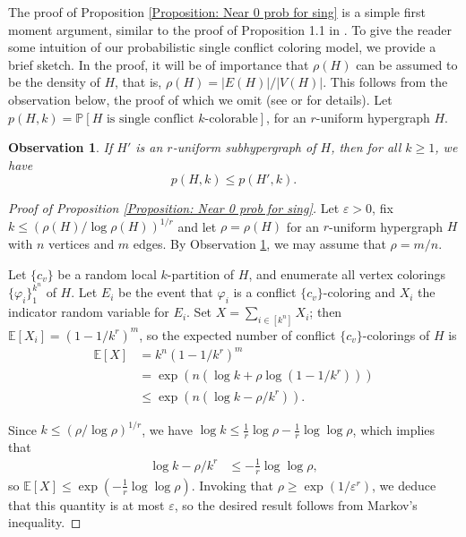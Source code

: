 \documentclass[12pt]{article}
\newtheorem{observation}[theorem]{Observation}
\newcommand{\E}{\mathbb{E}}
\renewcommand{\P}{\mathbb{P}}
\newcommand{\1}{\mathds{1}}
\begin{document}
The proof of Proposition  \ref{Proposition: Near 0 prob for sing} is a simple
first moment argument, similar to the proof of Proposition 1.1 in \cite{BernshteynDominikKaulMudrock}.
To give the reader some intuition of our probabilistic single conflict coloring model, we provide a brief sketch.
In the proof, it will be of importance that $\rho(H)$ can be assumed to be the density of $H$, that is, $\rho(H)=|E(H)|/|V(H)|$. This follows from the observation below, the proof of which we omit
(see \cite{BernshteynDominikKaulMudrock} or \cite{Eriksson} for details). 
Let $p(H,k)=\P[H \text{ is single conflict }k\text{-colorable}]$, for an $r$-uniform hypergraph $H$.
\begin{observation} 
\label{Observation: p'>p}
    If $H'$ is an $r$-uniform subhypergraph of $H$, then for all $k\geq 1$, we have
    $$
    p(H,k)\leq p(H',k).
    $$ 
\end{observation}
\begin{proof}[Proof of Proposition \ref{Proposition: Near 0 prob for sing}]
    Let $\varepsilon>0$, fix $k\leq (\rho(H)/\log \rho(H))^{1/r}$ and let $\rho=\rho(H)$ for an $r$-uniform hypergraph $H$ with $n$ vertices and $m$ edges. By Observation \ref{Observation: p'>p}, we may assume that $\rho=m/n$.

    Let $\{c_v\}$ be a random local $k$-partition of $H$, and enumerate all vertex colorings $\{\varphi_i\}_1^{k^n}$ of $H$. Let $E_i$ be the event that $\varphi_i$ is a conflict $\{c_v\}$-coloring and $X_i$ the indicator random variable for $E_i$. Set $X=\sum_{i\in [k^n]}X_i $; then
    $\E[X_i] 
    =(1-1/k^r)^m$,
    so the expected number of conflict $\{c_v\}$-colorings of $H$ is
    \begin{align*}
    \E[X] 
	&=k^n(1-1/k^r)^m\\
	&=\exp(n(\log k+\rho \log(1-1/k^r))) \\
    	&\leq \exp(n(\log k-\rho/k^r)).
    \end{align*}
    
    Since $k\leq (\rho/\log \rho)^{1/r}$, we have %
	$\log k \leq \frac{1}{r}\log \rho-\frac{1}{r}\log \log \rho$, which implies that
    \begin{align*}
    \log k - \rho/k^r 
    &\leq -\frac{1}{r}\log \log \rho,
    \end{align*}
    so
    $\E[X] 
    \leq \exp\left(-\frac{1}{r}\log \log \rho\right)$.
    Invoking that $\rho\geq \exp(1/\varepsilon^r)$, we deduce
	that this quantity is at most $\varepsilon$, so the desired result follows
	from Markov's inequality.
\end{proof}
\end{document}
